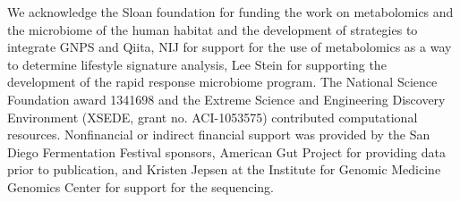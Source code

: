 We acknowledge the Sloan foundation for funding the work on metabolomics and the
microbiome of the human habitat and the development of strategies to integrate GNPS
and Qiita, NIJ for support for the use of metabolomics as a way to determine lifestyle
signature analysis, Lee Stein for supporting the development of the rapid response
microbiome program. The National Science Foundation award 1341698 and the Extreme
Science and Engineering Discovery Environment (XSEDE, grant no. ACI-1053575)
contributed computational resources. Nonfinancial or indirect financial support
was provided by the San Diego Fermentation Festival sponsors, American Gut Project
for providing data prior to publication, and Kristen Jepsen at the Institute for
Genomic Medicine Genomics Center for support for the sequencing.
